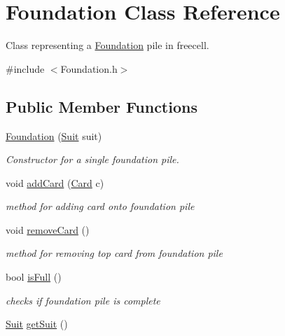 \hypertarget{class_foundation}{}\section{Foundation Class Reference}
\label{class_foundation}


Class representing a \hyperlink{class_foundation}{Foundation} pile in freecell.  




{\ttfamily \#include $<$Foundation.\+h$>$}

\subsection*{Public Member Functions}
\begin{DoxyCompactItemize}
\item 
\hyperlink{class_foundation_a938dadcd731426c64fffc5798b7ca174}{Foundation} (\hyperlink{_card_a_d_t_8h_af78e1c8ea5e6837b6ab9452a1e435e4e}{Suit} suit)
\begin{DoxyCompactList}\small\item\em Constructor for a single foundation pile. \end{DoxyCompactList}\item 
void \hyperlink{class_foundation_ae1c591ca11d0a2841be8622323ed2b5f}{add\+Card} (\hyperlink{class_card}{Card} c)
\begin{DoxyCompactList}\small\item\em method for adding card onto foundation pile \end{DoxyCompactList}\item 
void \hyperlink{class_foundation_a7da4c5c94ab7d2d1f2fd2780c4d2172d}{remove\+Card} ()\hypertarget{class_foundation_a7da4c5c94ab7d2d1f2fd2780c4d2172d}{}\label{class_foundation_a7da4c5c94ab7d2d1f2fd2780c4d2172d}

\begin{DoxyCompactList}\small\item\em method for removing top card from foundation pile \end{DoxyCompactList}\item 
bool \hyperlink{class_foundation_a8d62650abd98bfbb229db88c2dc3381b}{is\+Full} ()
\begin{DoxyCompactList}\small\item\em checks if foundation pile is complete \end{DoxyCompactList}\item 
\hyperlink{_card_a_d_t_8h_af78e1c8ea5e6837b6ab9452a1e435e4e}{Suit} \hyperlink{class_foundation_a69fd10eded9c724eef919ea0efd5bb11}{get\+Suit} ()\hypertarget{class_foundation_a69fd10eded9c724eef919ea0efd5bb11}{}\label{class_foundation_a69fd10eded9c724eef919ea0efd5bb11}


\end{DoxyCompactItemize}
